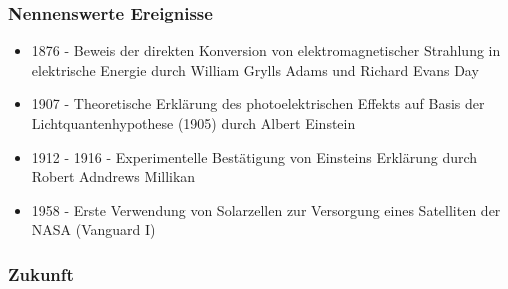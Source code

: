     \subsubsection{Nennenswerte Ereignisse}
        \begin{itemize}
            \item 1876 - Beweis der direkten Konversion von elektromagnetischer
                Strahlung in elektrische Energie durch William Grylls Adams und
                Richard Evans Day
            \item 1907 - Theoretische Erklärung des photoelektrischen Effekts auf
                Basis der Lichtquantenhypothese (1905) durch Albert Einstein
            \item 1912 - 1916 - Experimentelle Bestätigung von Einsteins Erklärung
                durch Robert Adndrews Millikan
            \item 1958 - Erste Verwendung von Solarzellen zur Versorgung eines
                Satelliten der NASA (Vanguard I) \cite{Wiki_Vanguard}
        \end{itemize}
    \subsubsection{Zukunft}